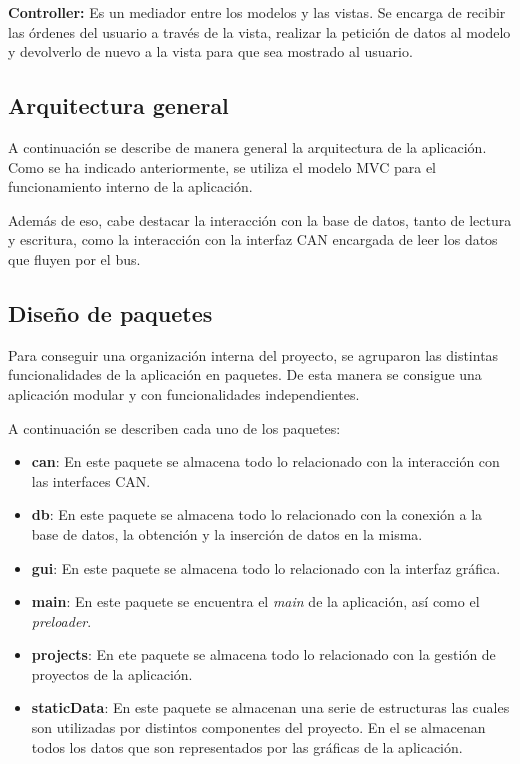 \textbf{Controller:} Es un mediador entre los modelos y las vistas. Se encarga de recibir las órdenes del usuario a través de la vista, realizar la petición de datos al modelo y devolverlo de nuevo a la vista para que sea mostrado al usuario.

\newpage
\subsection{Arquitectura general}

A continuación se describe de manera general la arquitectura de la aplicación. Como se ha indicado anteriormente, se utiliza el modelo MVC para el funcionamiento interno de la aplicación.

Además de eso, cabe destacar la interacción con la base de datos, tanto de lectura y escritura, como la interacción con la interfaz CAN encargada de leer los datos que fluyen por el bus.


\subsection{Diseño de paquetes}

Para conseguir una organización interna del proyecto, se agruparon las distintas funcionalidades de la aplicación en paquetes. De esta manera se consigue una aplicación modular y con funcionalidades independientes.


A continuación se describen cada uno de los paquetes:

\begin{itemize}
\item
\textbf{can}: En este paquete se almacena todo lo relacionado con la interacción con las interfaces CAN.
\item
\textbf{db}: En este paquete se almacena todo lo relacionado con la conexión a la base de datos, la obtención y la inserción de datos en la misma.
\item
\textbf{gui}: En este paquete se almacena todo lo relacionado con la interfaz gráfica. 
\item
\textbf{main}: En este paquete se encuentra el \emph{main} de la aplicación, así como el \emph{preloader}.
\item
\textbf{projects}: En ete paquete se almacena todo lo relacionado con la gestión de proyectos de la aplicación.
\item
\textbf{staticData}: En este paquete se almacenan una serie de estructuras las cuales son utilizadas por distintos componentes del proyecto. En el se almacenan todos los datos que son representados por las gráficas de la aplicación.
\end{itemize}

